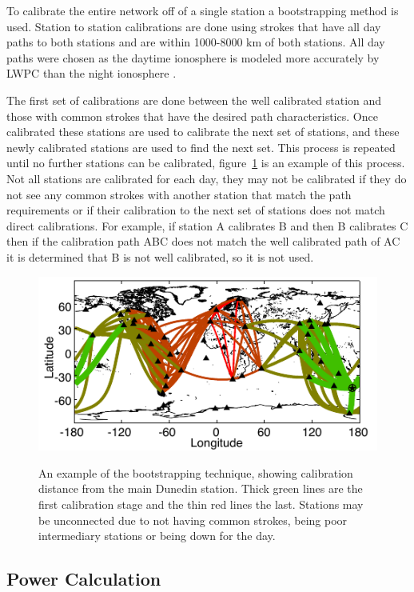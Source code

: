 To calibrate the entire network off of a single station a bootstrapping method is used.
Station to station calibrations are done using strokes that have all day paths to both stations and are within 1000-8000 km of both stations.
All day paths were chosen as the daytime ionosphere is modeled more accurately by LWPC than the night ionosphere \citep{McRae2000d}.

The first set of calibrations are done between the well calibrated station and those with common strokes that have the desired path characteristics.
Once calibrated these stations are used to calibrate the next set of stations, and these newly calibrated stations are used to find the next set.
This process is repeated until no further stations can be calibrated, figure~\ref{energy:fig:bootstrap} is an example of this process.
Not all stations are calibrated for each day, they may not be calibrated if they do not see any common strokes with another station that match the path requirements or if their calibration to the next set of stations does not match direct calibrations.
For example, if station A calibrates B and then B calibrates C then if the calibration path ABC does not match the well calibrated path of AC it is determined that B is not well calibrated, so it is not used.

\begin{figure}[ht!]
\centering
\includegraphics[scale=1]{energy/Figures/PPS_Hop.pdf}\\
\caption{An example of the bootstrapping technique, showing calibration distance from the main Dunedin station. Thick green lines are the first calibration stage and the thin red lines the last. Stations may be unconnected due to not having common strokes, being poor intermediary stations or being down for the day.}
\label{energy:fig:bootstrap}
\end{figure}

\subsection{Power Calculation}


